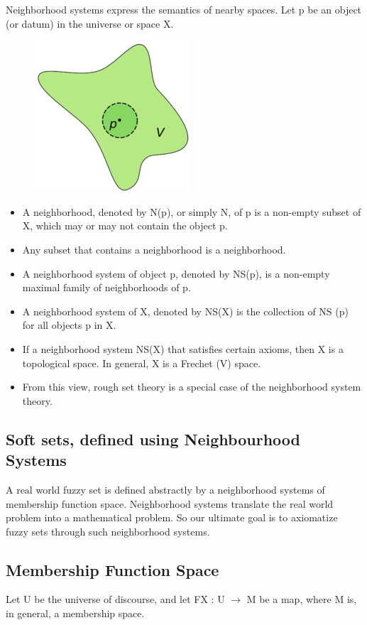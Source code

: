 \documentclass[12pt]{article} %
\begin{document}
Neighborhood systems express the semantics of
nearby spaces. Let p be an object (or datum) in the universe or
space X. 
\begin{figure}[h!]
  \centering
   \includegraphics[scale=0.50]{p.png}
\end{figure}
\begin{itemize}
\item{A neighborhood, denoted by N(p), or simply N,
of p is a non-empty subset of X, which may or
may not contain the object p.}
\item{Any subset that contains a
neighborhood is a neighborhood.}
\item{A neighborhood
system of object p, denoted by NS(p), is a non-empty
maximal family of neighborhoods of p.}
\item{A neighborhood system of X, denoted by NS(X) is the
collection of NS (p) for all objects p in X.}
\item{If a
neighborhood system NS(X) that satisfies certain
axioms, then X is a topological space. In
general, X is a Frechet (V) space.}
\item{From this view, rough set theory is a special case of the
neighborhood system theory.}
\end{itemize}


\subsection{Soft sets, defined using Neighbourhood Systems}
A real world fuzzy set is defined abstractly by a neighborhood systems of membership function space. Neighborhood systems translate the real world problem into a mathematical problem. So our ultimate goal is to axiomatize fuzzy sets through such neighborhood
systems.


\subsection{Membership Function Space}
Let U be the universe of discourse, and let
FX : U \begin{math} \rightarrow \end{math} M
be a map, where M is, in general, a membership space. 
\end{document}
